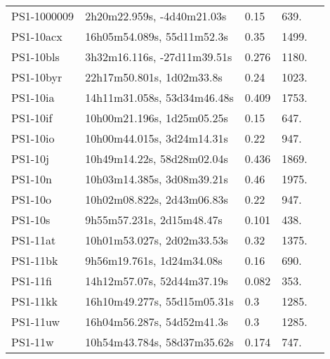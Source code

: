 \begin{longtable}{lllll}
      PS1-1000009 &     2h20m22.959s, -4d40m21.03s &     0.15 &           639. &    \citet{2014ApJ...795...44R} \\
        PS1-10acx &     16h05m54.089s, 55d11m52.3s &     0.35 &          1499. &    \citet{2014ApJ...795...44R} \\
        PS1-10bls &    3h32m16.116s, -27d11m39.51s &    0.276 &          1180. &    \citet{2014ApJ...795...44R} \\
        PS1-10byr &      22h17m50.801s, 1d02m33.8s &     0.24 &          1023. &    \citet{2014ApJ...795...44R} \\
         PS1-10ia &    14h11m31.058s, 53d34m46.48s &    0.409 &          1753. &    \citet{2014ApJ...795...44R} \\
         PS1-10if &     10h00m21.196s, 1d25m05.25s &     0.15 &           647. &    \citet{2014ApJ...795...44R} \\
         PS1-10io &     10h00m44.015s, 3d24m14.31s &     0.22 &           947. &    \citet{2014ApJ...795...44R} \\
          PS1-10j &     10h49m14.22s, 58d28m02.04s &    0.436 &          1869. &    \citet{2014ApJ...795...44R} \\
          PS1-10n &     10h03m14.385s, 3d08m39.21s &     0.46 &          1975. &    \citet{2014ApJ...795...44R} \\
          PS1-10o &     10h02m08.822s, 2d43m06.83s &     0.22 &           947. &    \citet{2014ApJ...795...44R} \\
          PS1-10s &      9h55m57.231s, 2d15m48.47s &    0.101 &           438. &    \citet{2014ApJ...795...44R} \\
         PS1-11at &     10h01m53.027s, 2d02m33.53s &     0.32 &          1375. &    \citet{2014ApJ...795...44R} \\
         PS1-11bk &      9h56m19.761s, 1d24m34.08s &     0.16 &           690. &    \citet{2014ApJ...795...44R} \\
         PS1-11fi &     14h12m57.07s, 52d44m37.19s &    0.082 &           353. &    \citet{2014ApJ...795...44R} \\
         PS1-11kk &    16h10m49.277s, 55d15m05.31s &      0.3 &          1285. &    \citet{2014ApJ...795...44R} \\
         PS1-11uw &     16h04m56.287s, 54d52m41.3s &      0.3 &          1285. &    \citet{2014ApJ...795...44R} \\
          PS1-11w &    10h54m43.784s, 58d37m35.62s &    0.174 &           747. &    \citet{2014ApJ...795...44R} \\

\end{longtable}
